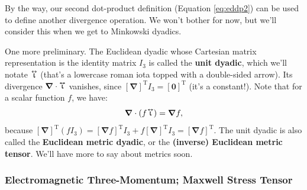 \documentclass[12pt]{article}
\renewcommand{\vv}[1]{\mathbf{#1}}
\newcommand{\del}{\boldsymbol{\nabla}}
\newcommand{\tightoverset}[2]{%
  \mathop{#2}\limits^{\vbox to -.5ex{\kern-0.75ex\hbox{$#1$}\vss}}}
\newcommand{\inlinedy}[1]{\tightoverset{\text{\tiny$\bm\leftrightarrow$}}{#1}}
\begin{document}
By the way, our second dot-product definition (Equation \ref{eq:eddp2}) can be used to define another divergence operation. We won't bother for now, but we'll consider this when we get to Minkowski dyadics.

One more preliminary. The Euclidean dyadic whose Cartesian matrix representation is the identity matrix $I_3$ is called the \textbf{unit dyadic}, which we'll notate $\inlinedy{\upiota}$ (that's a lowercase roman iota topped with a double-sided arrow). Its divergence $\del \cdot \inlinedy{\upiota}$ vanishes, since $[\del]^{\textrm{T}}I_3 = [\vv 0]^{\textrm{T}}$ (it's a constant!). Note that for a scalar function $f$, we have:
\begin{equation}\label{eq:divfi}
\del \cdot (f \mkern-2mu \inlinedy{\upiota}) = \del f,
\end{equation}
because ${[\del]^{\textrm{T}}(f I_3) = [\del f]^{\textrm{T}} I_3 + f [\del]^{\textrm{T}} I_3 = [\del f]^{\textrm{T}}}$. The unit dyadic is also called the \textbf{Euclidean metric dyadic}, or the \textbf{(inverse) Euclidean metric tensor}. We'll have more to say about metrics soon.

\subsubsection{Electromagnetic Three-Momentum; Maxwell Stress Tensor}
\end{document}
